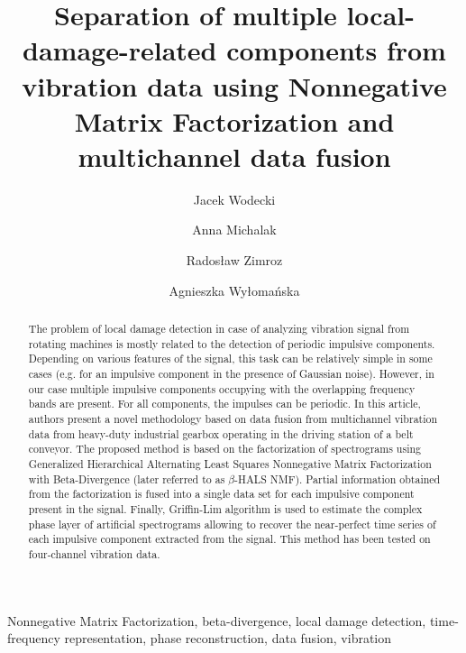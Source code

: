 \documentclass[3p,12pt]{elsarticle}
\begin{document}
\begin{frontmatter}

\title{Separation of multiple local-damage-related components from vibration data using Nonnegative Matrix Factorization and multichannel data fusion}


\author[label1]{Jacek Wodecki }
\author[label1]{Anna Michalak}
\author[label1]{Rados{\l}aw Zimroz}
\author[label2]{Agnieszka Wy{\l}oma{\'n}ska}

\address[label1]{Faculty of Geoengineering, Mining and Geology, Wroclaw University of Science and Technology, Na Grobli 15, 50-421 Wroclaw, Poland
\\\{jacek.wodecki, anna.michalak radoslaw.zimroz\}@pwr.edu.pl\\}
\address[label2]{Faculty of Pure and Applied Mathematics, Hugo Steinhaus Center, Wroclaw University of Science and Technology,Wybrze{\.z}e Wyspia{\'n}skiego 27, 50-370 Wroclaw, Poland
\\ agnieszka.wylomanska@pwr.edu.pl\\}

\begin{abstract}
The problem of local damage detection in case of analyzing vibration signal from rotating machines is mostly related to the detection of periodic impulsive components. Depending on various features of the signal, this task can be relatively simple in some cases (e.g. for an impulsive component in the presence of Gaussian noise). However, in our case multiple impulsive components occupying with the overlapping frequency bands are present. For all components, the impulses can be periodic. In this article, authors present a novel methodology based on data fusion from multichannel vibration data from heavy-duty industrial gearbox operating in the driving station of a belt conveyor. The proposed method is based on the factorization of spectrograms using Generalized Hierarchical Alternating Least Squares Nonnegative Matrix Factorization with Beta-Divergence (later referred to as $\beta$-HALS NMF). Partial information obtained from the factorization is fused into a single data set for each impulsive component present in the signal. Finally, Griffin-Lim algorithm is used to estimate the complex phase layer of artificial spectrograms allowing to recover the near-perfect time series of each impulsive component extracted from the signal. This method has been tested on four-channel vibration data.
\end{abstract}

\begin{keyword}
Nonnegative Matrix Factorization, beta-divergence, local damage detection, time-frequency representation, phase reconstruction, data fusion, vibration
\end{keyword}

\end{frontmatter}
\end{document}
